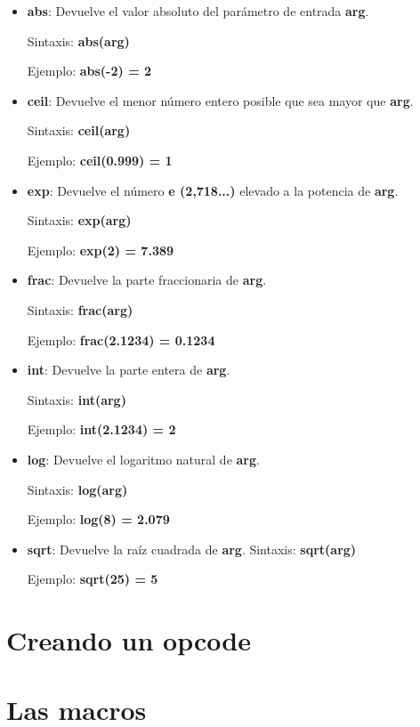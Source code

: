 \begin{itemize}
 \item \textbf{abs}: Devuelve el valor absoluto del parámetro de entrada \textbf{arg}. 
 
 Sintaxis: \textbf{abs(arg)}
 
 Ejemplo: \textbf{abs(-2) = 2}
 \item \textbf{ceil}: Devuelve el menor número entero posible que sea mayor que \textbf{arg}.
 
 Sintaxis: \textbf{ceil(arg)}
 
 Ejemplo: \textbf{ceil(0.999) = 1}
 \item \textbf{exp}: Devuelve el número \textbf{e (2,718...)} elevado a la potencia de \textbf{arg}.
 
 Sintaxis: \textbf{exp(arg)}
 
 Ejemplo: \textbf{exp(2) = 7.389}
 \item \textbf{frac}: Devuelve la parte fraccionaria de \textbf{arg}.
 
 Sintaxis: \textbf{frac(arg)}
 
 Ejemplo: \textbf{frac(2.1234) = 0.1234}
 \item \textbf{int}: Devuelve la parte entera de \textbf{arg}.
 
 Sintaxis: \textbf{int(arg)}
 
 Ejemplo: \textbf{int(2.1234) = 2}
 \item \textbf{log}: Devuelve el logaritmo natural de \textbf{arg}.
 
 Sintaxis: \textbf{log(arg)}
 
 Ejemplo: \textbf{log(8) = 2.079}
 \item \textbf{sqrt}: Devuelve la raíz cuadrada de \textbf{arg}.
 Sintaxis: \textbf{sqrt(arg)}
 
 Ejemplo: \textbf{sqrt(25) = 5}
\end{itemize}

\section{Creando un opcode}

\section{Las macros}
